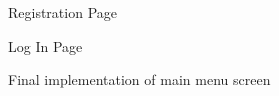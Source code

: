 \documentclass{l4proj}
\begin{document}
\begin{appendices}
\begin{figure}[H]
    \caption{Registration Page}
    \label{fig:registration_page}
\end{figure}



\begin{figure}[H]
    \caption{Log In Page}
    \label{fig:log_in_page}
\end{figure}


\begin{figure}[H]
    \caption{Final implementation of main menu screen}
    \label{fig:menu_final}
\end{figure}


\end{appendices}
\end{document}
